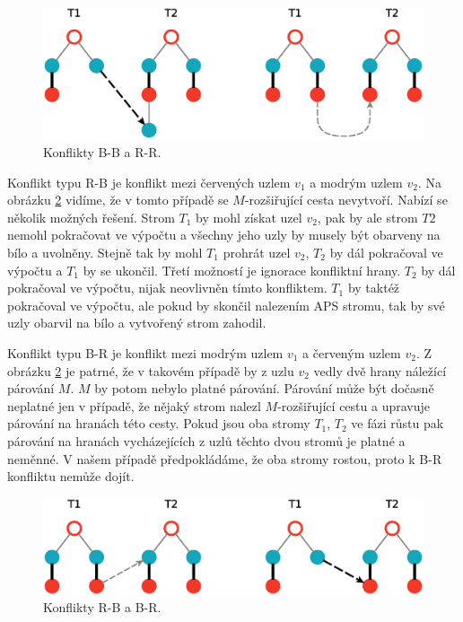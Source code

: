 \documentclass[a4paper, 11pt, titlepage, final]{article}[3. prosinec 2011]
\begin{document}
\begin{figure}[ht]
  \centering
  \includegraphics[scale=0.5]{img/XXconflicts.eps}
  \caption{Konflikty B-B a R-R.}
  \label{imgXX}
\end{figure}

Konflikt typu R-B je konflikt mezi červených uzlem $v_1$ a modrým uzlem $v_2$. Na obrázku \ref{imgXY} vidíme, že v tomto případě se $M$-rozšiřující cesta nevytvoří. Nabízí se několik možných řešení. Strom $T_1$ by mohl získat uzel $v_2$, pak by ale strom $T2$ nemohl pokračovat ve výpočtu a všechny jeho uzly by musely být obarveny na bílo a uvolněny. Stejně tak by mohl $T_1$ prohrát uzel $v_2$, $T_2$ by dál pokračoval ve výpočtu a $T_1$ by se ukončil. Třetí možností je ignorace konfliktní hrany. $T_2$ by dál pokračoval ve výpočtu, nijak neovlivněn tímto konfliktem. $T_1$ by taktéž pokračoval ve výpočtu, ale pokud by skončil nalezením APS stromu, tak by své uzly obarvil na bílo a vytvořený strom zahodil.

Konflikt typu B-R je konflikt mezi modrým uzlem $v_1$ a červeným uzlem $v_2$. Z obrázku \ref{imgXY} je patrné, že v takovém případě by z uzlu $v_2$ vedly dvě hrany náležící párování $M$. $M$ by potom nebylo platné párování. Párování může být dočasně neplatné jen v případě, že nějaký strom nalezl $M$-rozšiřující cestu a upravuje párování na hranách této cesty. Pokud jsou oba stromy $T_1$, $T_2$ ve fázi růstu pak párování na hranách vycházejících z uzlů těchto dvou stromů je platné a neměnné. V našem případě předpokládáme, že oba stromy rostou, proto k B-R konfliktu nemůže dojít.

\begin{figure}[ht]
  \centering
  \includegraphics[scale=0.5]{img/XYconflicts.eps}
  \caption{Konflikty R-B a B-R.}
  \label{imgXY}
\end{figure}
\end{document}
